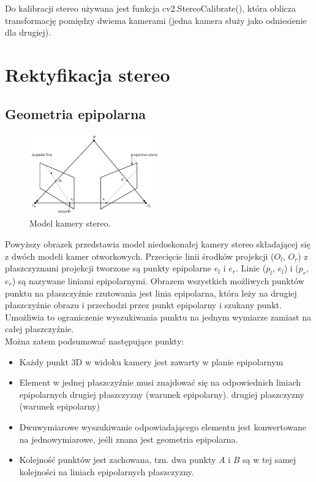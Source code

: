 \documentclass[magisterska]{pracadypl}
\begin{document}
Do kalibracji stereo używana jest funkcja cv2.StereoCalibrate(), która oblicza transformację pomiędzy dwiema kamerami (jedna kamera służy jako odniesienie dla drugiej).

\section{Rektyfikacja stereo}

\subsection{Geometria epipolarna}

\begin{figure}[H]  %
    \centering  %
    \includegraphics[width=0.5\textwidth]{images/epipolar.png}  %
    \captionsetup{font=footnotesize}
    \caption[Model kamery stereo. Learning OpenCV 3, O'Reilly, Str. 709]{Model kamery stereo.}
    \label{fig:rpi}  %
\end{figure}

Powyższy obrazek przedstawia model niedoskonałej kamery stereo składającej się z dwóch modeli kamer otworkowych.
Przecięcie linii środków projekcji ($O_l$, $O_r$) z płaszczyznami projekcji tworzone są punkty epipolarne $e_l$ i $e_r$. Linie ($p_l$, $e_l$) i ($p_r$, $e_r$) są nazywane liniami epipolarnymi. Obrazem wszystkich możliwych punktów punktu
na płaszczyźnie rzutowania jest linia epipolarna, która leży na drugiej płaszczyźnie obrazu i
przechodzi przez punkt epipolarny i szukany punkt. Umożliwia to ograniczenie wyszukiwania punktu na jednym wymiarze zamiast na całej płaszczyźnie.\\
Można zatem podsumować następujące punkty:

\begin{itemize}
  \item Każdy punkt 3D w widoku kamery jest zawarty w planie epipolarnym
  \item Element w jednej płaszczyźnie musi znajdować się na odpowiednich liniach epipolarnych drugiej płaszczyzny (warunek epipolarny).
drugiej płaszczyzny (warunek epipolarny)
  \item Dwuwymiarowe wyszukiwanie odpowiadającego elementu jest konwertowane na
jednowymiarowe, jeśli znana jest geometria epipolarna.
  \item Kolejność punktów jest zachowana, tzn. dwa punkty $A$ i $B$ są w tej samej kolejności na liniach epipolarnych płaszczyzny.

\end{itemize}
\end{document}
